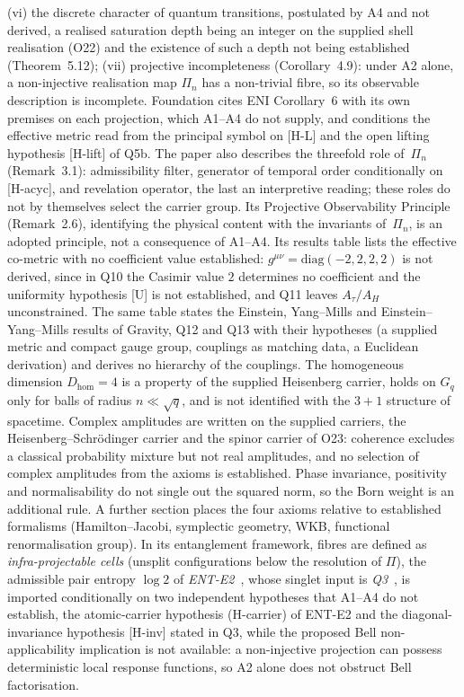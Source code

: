 \documentclass[11pt,a4paper]{article}
\begin{document}
    (vi) the discrete character of quantum transitions, postulated by A4 and not derived, a realised
    saturation depth being an integer on the supplied shell realisation (O22) and the existence of such a
    depth not being established (Theorem~5.12);
    (vii) projective incompleteness (Corollary~4.9): under A2 alone, a non-injective realisation map
    $\Pi_n$ has a non-trivial fibre, so its observable description is incomplete.
    Foundation cites ENI Corollary~6 with its own premises on each projection, which A1--A4 do not supply, and
    conditions the effective metric read from the principal symbol on [H-L] and the open lifting hypothesis
    [H-lift] of Q5b.
    The paper also describes the threefold role of~$\Pi_n$ (Remark~3.1):
    admissibility filter, generator of temporal order conditionally on [H-acyc], and revelation
    operator, the last an interpretive reading; these roles do not by themselves select the carrier group.
    Its Projective Observability Principle (Remark~2.6), identifying the physical content with the invariants
    of~$\Pi_n$, is an adopted principle, not a consequence of A1--A4.
    Its results table lists the effective co-metric with no coefficient value established:
    $g^{\mu\nu}=\mathrm{diag}(-2,2,2,2)$ is not derived, since in Q10 the Casimir value $2$ determines no
    coefficient and the uniformity hypothesis [U] is not established, and Q11 leaves $A_\tau/A_H$
    unconstrained.
    The same table states the Einstein, Yang--Mills and Einstein--Yang--Mills results of Gravity, Q12 and Q13
    with their hypotheses (a supplied metric and compact gauge group, couplings as matching data, a Euclidean
    derivation) and derives no hierarchy of the couplings.
    The homogeneous dimension $D_{\mathrm{hom}}=4$ is a property of the supplied Heisenberg carrier, holds on
    $G_q$ only for balls of radius $n \ll \sqrt{q}$, and is not identified with the $3+1$ structure of spacetime.
    Complex amplitudes are written on the supplied carriers, the Heisenberg--Schr\"odinger carrier and the
    spinor carrier of O23: coherence excludes a classical probability mixture but not real amplitudes, and no
    selection of complex amplitudes from the axioms is established.
    Phase invariance, positivity and normalisability do not single out the squared norm, so the Born weight
    is an additional rule.
    A further section places the four axioms relative to established formalisms
    (Hamilton--Jacobi, symplectic geometry, WKB, functional renormalisation group).
    In its entanglement framework, fibres are defined as
    \emph{infra-projectable cells} (unsplit configurations below the resolution of $\Pi$), the
    admissible pair entropy $\log 2$ of \emph{ENT-E2}~\cite{Beau2026ent2}, whose singlet input is
    \emph{Q3}~\cite{Beau2026q3}, is imported conditionally on two independent hypotheses that A1--A4 do
    not establish, the atomic-carrier hypothesis (H-carrier) of ENT-E2 and the diagonal-invariance
    hypothesis [H-inv] stated in Q3, while the proposed Bell non-applicability implication is not available: a non-injective
    projection can possess deterministic local response functions, so A2 alone does not obstruct
    Bell factorisation.
\end{document}
